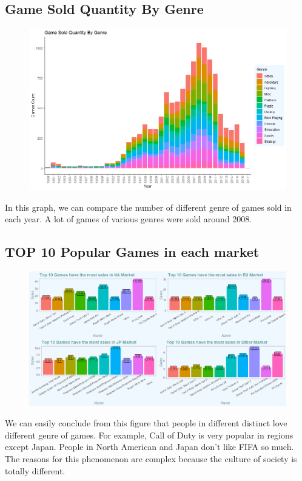 \documentclass{article}
\begin{document}
	\subsection{Game Sold Quantity By Genre}
	\begin{figure}[H]
	\centering
	\includegraphics[scale = 0.6]{Figures/Genre_year.png}
	\end{figure}
	In this graph, we can compare the number of different genre of games sold in each year. A lot of games of various genres were sold around 2008.
	

	\subsection{TOP 10 Popular Games in each market}
	\begin{figure}[H]
	\centering
	\includegraphics[scale = 0.6]{Figures/TOP10Game_each_market.png}
	\end{figure}
	We can easily conclude from this figure that people in different distinct love different genre of games. For example, Call of Duty is very popular in regions except Japan. People in North American and Japan don't like FIFA so much. The reasons for this phenomenon are complex because the culture of society is totally different. 
	
	

	
\end{document}

